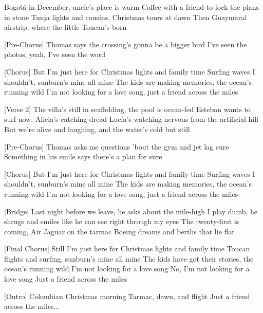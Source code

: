 \begin{lyrics}
[Verse 1]
Bogotá in December, uncle's place is warm
Coffee with a friend to lock the plans in stone
Tunja lights and cousins, Christmas tours at dawn
Then Guaymaral airstrip, where the little Toucan's born

[Pre-Chorus]
Thomas says the crossing's gonna be a bigger bird
I've seen the photos, yeah, I've seen the word

[Chorus]
But I'm just here for Christmas lights and family time
Surfing waves I shouldn't, sunburn's mine all mine
The kids are making memories, the ocean's running wild
I'm not looking for a love song, just a friend across the miles

[Verse 2]
The villa's still in scaffolding, the pool is ocean-fed
Esteban wants to surf now, Alicia's catching dread
Lucía's watching nervous from the artificial hill
But we're alive and laughing, and the water's cold but still

[Pre-Chorus]
Thomas asks me questions 'bout the gym and jet lag cure
Something in his smile says there's a plan for sure

[Chorus]
But I'm just here for Christmas lights and family time
Surfing waves I shouldn't, sunburn's mine all mine
The kids are making memories, the ocean's running wild
I'm not looking for a love song, just a friend across the miles

[Bridge]
Last night before we leave, he asks about the mile-high
I play dumb, he shrugs and smiles like he can see right through my eyes
The twenty-first is coming, Air Jaguar on the tarmac
Boeing dreams and berths that lie flat

[Final Chorus]
Still I'm just here for Christmas lights and family time
Toucan flights and surfing, sunburn's mine all mine
The kids have got their stories, the ocean's running wild
I'm not looking for a love song
No, I'm not looking for a love song
Just a friend across the miles

[Outro]
Colombian Christmas morning
Tarmac, dawn, and flight
Just a friend across the miles...
\end{lyrics}

